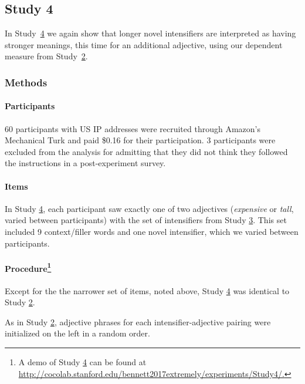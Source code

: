 \documentclass[10pt,letterpaper]{article}
\newcommand{\w}[1]{\emph{#1}}
\newcommand{\todo}[1]{{\color{red}#1}}
\begin{document}


\subsection{Study 4 \label{sec:study4}}

In Study~\hyperref[sec:study4]{4} we again show that longer novel intensifiers are interpreted as having stronger meanings, this time for an additional adjective, using our dependent measure from Study~\hyperref[sec:study2]{2}.

\subsubsection{Methods}

\paragraph{Participants}
60 participants with US IP addresses were recruited through Amazon's Mechanical Turk and paid \$0.16 for their participation. 3 participants were excluded from the analysis for admitting that they did not think they followed the instructions in a post-experiment survey.

\paragraph{Items}

In Study \hyperref[sec:study4]{4}, each participant saw exactly one of two adjectives (\w{expensive} or \w{tall}, varied between participants) with the set of intensifiers from Study \hyperref[sec:study3]{3}. This set included 9 context/filler words and one novel intensifier, which we varied between participants.

\paragraph{Procedure\footnote{A demo of Study \hyperref[sec:study4]{4} can be found at \url{http://cocolab.stanford.edu/bennett2017extremely/experiments/Study4/.}}}

Except for the the narrower set of items, noted above, Study \hyperref[sec:study4]{4} was identical to Study \hyperref[sec:study2]{2}. 

As in Study \hyperref[sec:study2]{2}, adjective phrases for each intensifier-adjective pairing were initialized on the left in a random order.
\end{document}
